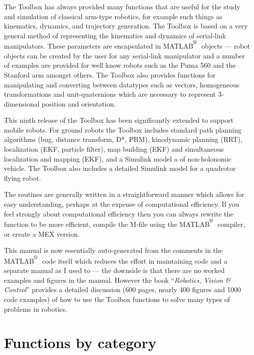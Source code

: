 \documentclass[a4paper]{report}
\def\Mlab{MATLAB$^{\textsuperscript{\textregistered}}$}
\begin{document}
The Toolbox has always provided many functions that are useful for the study and simulation
of classical arm-type robotics, for example
such things as kinematics, dynamics, and  trajectory generation.
The Toolbox is based on a very general method of representing the kinematics
and dynamics of serial-link manipulators.
These parameters  are encapsulated in \Mlab\  objects ---  robot objects
can be created by the user for any serial-link manipulator and a number
of examples are provided for well know robots such as the Puma 560 and the
Stanford arm amongst others.
The Toolbox also provides functions for manipulating and converting
between datatypes such
as vectors, homogeneous transformations and unit-quaternions which are necessary
to represent 3-dimensional position and orientation.

This ninth release of the Toolbox has been significantly extended to support mobile robots.
For ground robots the Toolbox includes standard path planning algorithms (bug, distance transform, D*, PRM), kinodynamic planning (RRT),
localization (EKF, particle filter), map building (EKF) and simultaneous localization and mapping (EKF), and
a Simulink model a of non-holonomic vehicle.
The Toolbox also includes a detailed Simulink model for a quadrotor flying robot.

The routines are generally written in a straightforward manner which allows
for easy understanding, perhaps at the expense of computational efficiency.
If you feel strongly about computational efficiency then you can always
rewrite the function to be more efficient,
compile the M-file using the \Mlab\   compiler, or
create a MEX version.

This manual is now essentially auto-generated from the comments in the \Mlab\ code itself which reduces the effort
in maintaining code and a separate manual as I used to --- the downside is that there are no worked examples and figures in the manual.
However the book ``\textit{Robotics, Vision \& Control}''  provides a detailed discussion (600 pages, nearly 400 figures and 1000 code examples)
of how to use the Toolbox functions to
solve many types of problems in robotics.


\newpage
\tableofcontents
\newpage
\chapter*{Functions by category}
\begin{multicols}{2}

\end{multicols}
\newpage
\end{document}
